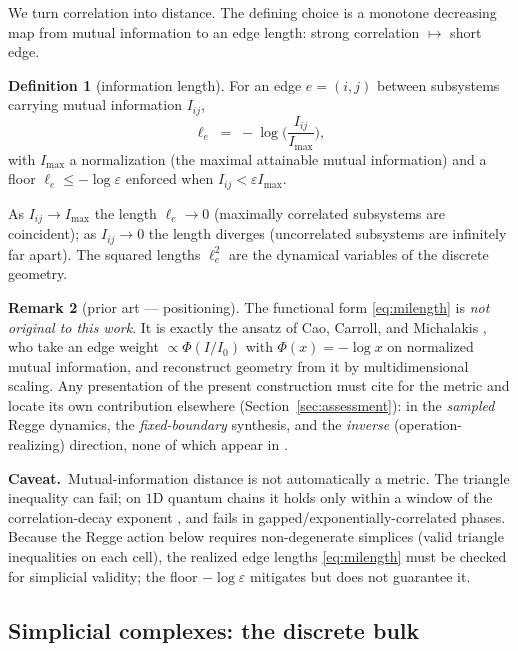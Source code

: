 \documentclass[11pt]{article}
\theoremstyle{definition}
\newtheorem{definition}{Definition}[section]
\newtheorem{remark}[definition]{Remark}
\theoremstyle{plain}
\newcommand{\caveat}[1]{\par\noindent\textcolor{red!60!black}{\textbf{Caveat.}}\ #1\par}
\begin{document}
We turn correlation into distance. The defining choice is a monotone decreasing map from
mutual information to an edge length: strong correlation $\mapsto$ short edge.

\begin{definition}[information length]
For an edge $e=(i,j)$ between subsystems carrying mutual information $I_{ij}$,
\begin{equation}
\ell_{e} \;=\; -\log\!\Big(\frac{I_{ij}}{I_{\max}}\Big),
\label{eq:milength}
\end{equation}
with $I_{\max}$ a normalization (the maximal attainable mutual information) and a floor
$\ell_e \le -\log\varepsilon$ enforced when $I_{ij}<\varepsilon I_{\max}$.
\end{definition}

As $I_{ij}\to I_{\max}$ the length $\ell_e\to 0$ (maximally correlated subsystems are
coincident); as $I_{ij}\to 0$ the length diverges (uncorrelated subsystems are infinitely
far apart). The squared lengths $\ell_e^2$ are the dynamical variables of the discrete
geometry.

\begin{remark}[prior art --- positioning]
The functional form \eqref{eq:milength} is \emph{not original to this work}. It is exactly
the ansatz of Cao, Carroll, and Michalakis \cite{cao2017}, who take an edge weight
$\propto \Phi(I/I_0)$ with $\Phi(x)=-\log x$ on normalized mutual information, and
reconstruct geometry from it by multidimensional scaling. Any presentation of the present
construction must cite \cite{cao2017} for the metric and locate its own contribution
elsewhere (Section~\ref{sec:assessment}): in the \emph{sampled} Regge dynamics, the
\emph{fixed-boundary} synthesis, and the \emph{inverse} (operation-realizing) direction,
none of which appear in \cite{cao2017}.
\end{remark}

\caveat{Mutual-information distance is not automatically a metric. The triangle inequality
can fail; on $1$D quantum chains it holds only within a window of the correlation-decay
exponent \cite{leighton2025}, and fails in gapped/exponentially-correlated phases. Because
the Regge action below requires non-degenerate simplices (valid triangle inequalities on
each cell), the realized edge lengths \eqref{eq:milength} must be checked for simplicial
validity; the floor $-\log\varepsilon$ mitigates but does not guarantee it.}

\subsection{Simplicial complexes: the discrete bulk}
\label{sec:complex}
\end{document}
